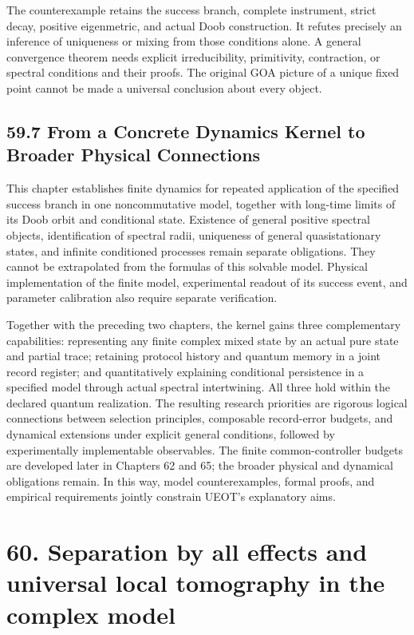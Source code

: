 \documentclass[
  11pt,
  oneside]{book}
\begin{document}
The counterexample retains the success branch, complete instrument,
strict decay, positive eigenmetric, and actual Doob construction. It
refutes precisely an inference of uniqueness or mixing from those
conditions alone. A general convergence theorem needs explicit
irreducibility, primitivity, contraction, or spectral conditions and
their proofs. The original GOA picture of a unique fixed point cannot be
made a universal conclusion about every object.

\section{59.7 From a Concrete Dynamics Kernel to Broader Physical
Connections}

This chapter establishes finite dynamics for repeated application of the
specified success branch in one noncommutative model, together with
long-time limits of its Doob orbit and conditional state. Existence of
general positive spectral objects, identification of spectral radii,
uniqueness of general quasistationary states, and infinite conditioned
processes remain separate obligations. They cannot be extrapolated from
the formulas of this solvable model. Physical implementation of the
finite model, experimental readout of its success event, and parameter
calibration also require separate verification.

Together with the preceding two chapters, the kernel gains three
complementary capabilities: representing any finite complex mixed state
by an actual pure state and partial trace; retaining protocol history
and quantum memory in a joint record register; and quantitatively
explaining conditional persistence in a specified model through actual
spectral intertwining. All three hold within the declared quantum
realization. The resulting research priorities are rigorous logical
connections between selection principles, composable record-error
budgets, and dynamical extensions under explicit general conditions,
followed by experimentally implementable observables. The finite
common-controller budgets are developed later in Chapters 62 and 65; the
broader physical and dynamical obligations remain. In this way, model
counterexamples, formal proofs, and empirical requirements jointly
constrain UEOT's explanatory aims.

\chapter{60. Separation by all effects and universal local tomography in
the complex model}\label{ch-60}
\end{document}
